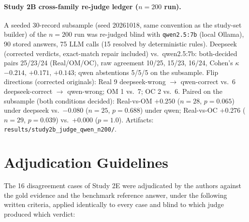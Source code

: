 \documentclass[11pt]{article}
\begin{document}
\paragraph{Study 2B cross-family re-judge ledger ($n{=}200$ run).}
A seeded 30-record subsample (seed 20261018, same convention as the
study-set builder) of the $n{=}200$ run was re-judged blind with
\texttt{qwen2.5:7b} (local Ollama), 90 stored answers, 75 LLM calls
(15 resolved by deterministic rules). Deepseek (corrected verdicts,
exact-match repair included) vs.\ qwen2.5:7b: both-decided pairs
25/23/24 (Real/OM/OC), raw agreement 10/25, 15/23, 16/24, Cohen's
$\kappa$ $-0.214$, $+0.171$, $+0.143$; qwen abstentions 5/5/5 on the
subsample. Flip directions (corrected originals): Real 9 deepseek-wrong
$\to$ qwen-correct vs.\ 6 deepseek-correct $\to$ qwen-wrong; OM 1
vs.\ 7; OC 2 vs.\ 6. Paired on the subsample (both conditions
decided): Real-vs-OM $+0.250$ ($n{=}28$, $p{=}0.065$) under deepseek
vs.\ $-0.080$ ($n{=}25$, $p{=}0.688$) under qwen; Real-vs-OC $+0.276$
($n{=}29$, $p{=}0.039$) vs.\ $+0.000$ ($p{=}1.0$).
Artifacts: \texttt{results/study2b\_judge\_qwen\_n200/}.

\section{Adjudication Guidelines}
\label{app:adjudication}

The 16 disagreement cases of Study 2E were adjudicated by the authors
against the gold evidence and the benchmark reference answer, under the
following written criteria, applied identically to every case and blind
to which judge produced which verdict:
\end{document}
